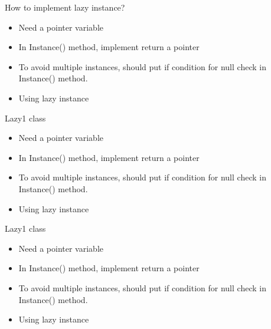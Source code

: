 \documentclass[13pt]{beamer}
\begin{document}
\begin{frame}{How to implement lazy instance?}
\begin{itemize}
\setlength\itemsep{1em}

\item Need a pointer variable

\item In Instance() method, implement return a pointer

\item To avoid multiple instances, should put if condition for null check in Instance() method.

\item Using lazy instance

\end{itemize}
\end{frame}

\begin{frame}{Lazy1 class}
\begin{itemize}
\setlength\itemsep{1em}

\item Need a pointer variable

\item In Instance() method, implement return a pointer

\item To avoid multiple instances, should put if condition for null check in Instance() method.

\item Using lazy instance

\end{itemize}
\end{frame}

\begin{frame}{Lazy1 class}
\begin{itemize}
\setlength\itemsep{1em}

\item Need a pointer variable

\item In Instance() method, implement return a pointer

\item To avoid multiple instances, should put if condition for null check in Instance() method.

\item Using lazy instance

\end{itemize}
\end{frame}
\end{document}
